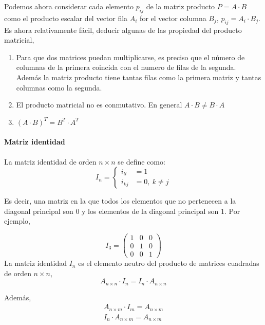 Podemos ahora considerar  cada elemento $p_{ij}$ de la matriz producto $P=A\cdot B$ como el producto escalar del vector fila $A_i$ for el vector columna $B_j$, $p_{ij}=A_i\cdot B_j$. 
Es ahora relativamente fácil, deducir algunas de las propiedad del producto matricial,

\begin{enumerate}
\item Para que dos matrices puedan multiplicarse, es preciso que el número de columnas de la primera coincida con el numero de filas de la segunda. Además la matriz producto tiene tantas filas como la primera matriz y tantas columnas como la segunda.

\item El producto matricial no es conmutativo. En general $A\cdot B \neq B \cdot A$

\item $(A\cdot B)^T=B^T\cdot A^T$
\end{enumerate}

\paragraph{Matriz identidad} La matriz identidad de orden $n\times n$ se 
define como:
\begin{equation*}
I_n= \left\{ 
\begin{aligned}
i_{ll}&=1\\
i_{kj}&=0, \ k\neq j
\end{aligned}
\right.
\end{equation*}

Es decir, una matriz en la que todos los elementos que no pertenecen a la diagonal principal son $0$ y los elementos de la diagonal principal son $1$. Por ejemplo,

\begin{equation*}
I_3=\begin{pmatrix}
1& 0& 0\\
0& 1& 0\\
0& 0& 1
\end{pmatrix}
\end{equation*}
La matriz identidad $I_n$ es el elemento neutro del producto de matrices cuadradas de orden $n\times n$,
\begin{equation*}
A_{n\times n}\cdot I_n=I_n\cdot A_{n\times n}
\end{equation*}

Además,
\begin{gather*}
A_{n\times m}\cdot I_m=A_{n \times m}\\
I_n\cdot A_{n\times m}=A_{n\times m}
\end{gather*}


